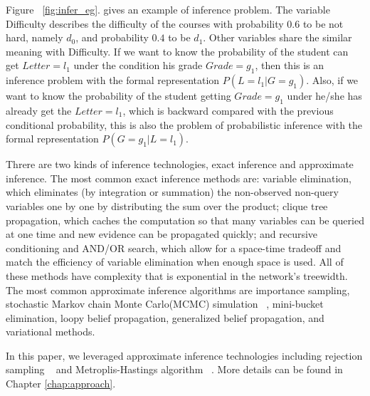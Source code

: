 Figure ~\ref{fig:infer_eg}. gives an example of inference problem. The variable Difficulty describes the difficulty of the courses with probability $0.6$ to be not hard, namely $d_0$, and probability $0.4$ to be $d_1$. Other variables share the similar meaning with Difficulty. If we want to know the probability of the student can get $Letter = l_1$ under the condition his grade $Grade = g_1$, then this is an inference problem with the formal representation $P (L = l_1 | G = g_1)$. Also, if we want to know the probability of the student getting $Grade = g_1$ under he/she has already get the $Letter = l_1$, which is backward compared with the previous conditional probability, this is also the problem of probabilistic inference with the formal representation $P (G = g_1 | L = l_1)$.

Threre are two kinds of inference technologies, exact inference and approximate inference. The most common exact inference methods are: variable elimination, which eliminates (by integration or summation) the non-observed non-query variables one by one by distributing the sum over the product; clique tree propagation, which caches the computation so that many variables can be queried at one time and new evidence can be propagated quickly; and recursive conditioning and AND/OR search, which allow for a space-time tradeoff and match the efficiency of variable elimination when enough space is used. All of these methods have complexity that is exponential in the network's treewidth. The most common approximate inference algorithms are importance sampling, stochastic Markov chain Monte Carlo(MCMC) simulation ~\cite{mcmc}, mini-bucket elimination, loopy belief propagation, generalized belief propagation, and variational methods.

In this paper, we leveraged approximate inference technologies including rejection sampling ~\cite{reject} and Metroplis-Hastings algorithm ~\cite{mh}. More details can be found in Chapter \ref{chap:approach}.

